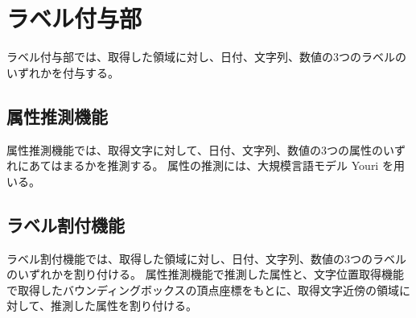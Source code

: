 \section{ラベル付与部}\label{sec:label_link_part}
ラベル付与部では、取得した領域に対し、日付、文字列、数値の3つのラベルのいずれかを付与する。


\subsection{属性推測機能}\label{subsec:att_prediction_feature}
属性推測機能では、取得文字に対して、日付、文字列、数値の3つの属性のいずれにあてはまるかを推測する。
属性の推測には、大規模言語モデル Youri を用いる。

\subsection{ラベル割付機能}\label{subsec:label_link_feature}
ラベル割付機能では、取得した領域に対し、日付、文字列、数値の3つのラベルのいずれかを割り付ける。
属性推測機能で推測した属性と、文字位置取得機能で取得したバウンディングボックスの頂点座標をもとに、取得文字近傍の領域に対して、推測した属性を割り付ける。
